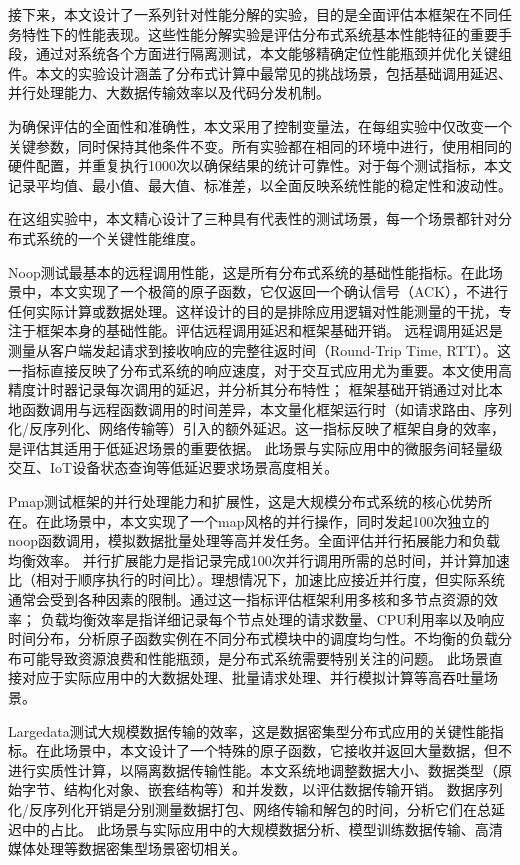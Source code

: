 接下来，本文设计了一系列针对性能分解的实验，目的是全面评估本框架在不同任务特性下的性能表现。这些性能分解实验是评估分布式系统基本性能特征的重要手段，通过对系统各个方面进行隔离测试，本文能够精确定位性能瓶颈并优化关键组件。本文的实验设计涵盖了分布式计算中最常见的挑战场景，包括基础调用延迟、并行处理能力、大数据传输效率以及代码分发机制。

为确保评估的全面性和准确性，本文采用了控制变量法，在每组实验中仅改变一个关键参数，同时保持其他条件不变。所有实验都在相同的环境中进行，使用相同的硬件配置，并重复执行1000次以确保结果的统计可靠性。对于每个测试指标，本文记录平均值、最小值、最大值、标准差，以全面反映系统性能的稳定性和波动性。

在这组实验中，本文精心设计了三种具有代表性的测试场景，每一个场景都针对分布式系统的一个关键性能维度。

Noop测试最基本的远程调用性能，这是所有分布式系统的基础性能指标。在此场景中，本文实现了一个极简的原子函数，它仅返回一个确认信号（ACK），不进行任何实际计算或数据处理。这样设计的目的是排除应用逻辑对性能测量的干扰，专注于框架本身的基础性能。评估远程调用延迟和框架基础开销。
远程调用延迟是测量从客户端发起请求到接收响应的完整往返时间（Round-Trip Time, RTT）。这一指标直接反映了分布式系统的响应速度，对于交互式应用尤为重要。本文使用高精度计时器记录每次调用的延迟，并分析其分布特性；
框架基础开销通过对比本地函数调用与远程函数调用的时间差异，本文量化框架运行时（如请求路由、序列化/反序列化、网络传输等）引入的额外延迟。这一指标反映了框架自身的效率，是评估其适用于低延迟场景的重要依据。
此场景与实际应用中的微服务间轻量级交互、IoT设备状态查询等低延迟要求场景高度相关。
    
Pmap测试框架的并行处理能力和扩展性，这是大规模分布式系统的核心优势所在。在此场景中，本文实现了一个map风格的并行操作，同时发起100次独立的noop函数调用，模拟数据批量处理等高并发任务。全面评估并行拓展能力和负载均衡效率。
并行扩展能力是指记录完成100次并行调用所需的总时间，并计算加速比（相对于顺序执行的时间比）。理想情况下，加速比应接近并行度，但实际系统通常会受到各种因素的限制。通过这一指标评估框架利用多核和多节点资源的效率；
负载均衡效率是指详细记录每个节点处理的请求数量、CPU利用率以及响应时间分布，分析原子函数实例在不同分布式模块中的调度均匀性。不均衡的负载分布可能导致资源浪费和性能瓶颈，是分布式系统需要特别关注的问题。
此场景直接对应于实际应用中的大数据处理、批量请求处理、并行模拟计算等高吞吐量场景。
    
Largedata测试大规模数据传输的效率，这是数据密集型分布式应用的关键性能指标。在此场景中，本文设计了一个特殊的原子函数，它接收并返回大量数据，但不进行实质性计算，以隔离数据传输性能。本文系统地调整数据大小、数据类型（原始字节、结构化对象、嵌套结构等）和并发数，以评估数据传输开销。
数据序列化/反序列化开销是分别测量数据打包、网络传输和解包的时间，分析它们在总延迟中的占比。
此场景与实际应用中的大规模数据分析、模型训练数据传输、高清媒体处理等数据密集型场景密切相关。

